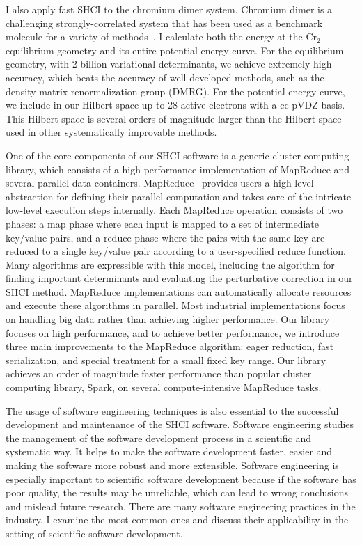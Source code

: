 \documentclass[phd,tocprelim]{cornell}
\begin{document}
I also apply fast SHCI to the chromium dimer system.
Chromium dimer is a challenging strongly-correlated system that has been used as a benchmark molecule for a variety of methods~\cite{Scu-JCP-91,KurYan-JCP-11,PurZhaKra-JCP-15,MaManOlsGag-JCTC-16,VanMalVer-JCTC-16,GuoWatHuSunCha-JCTC-16}.
I calculate both the energy at the Cr$_2$ equilibrium geometry and its entire potential energy curve.
For the equilibrium geometry, with 2 billion variational determinants, we achieve extremely high accuracy, which beats the accuracy of well-developed methods, such as the density matrix renormalization group (DMRG).
For the potential energy curve, we include in our Hilbert space up to 28 active electrons with a cc-pVDZ basis.
This Hilbert space is several orders of magnitude larger than the Hilbert space used in other systematically improvable methods.

One of the core components of our SHCI software is a generic cluster computing library, which consists of a high-performance implementation of MapReduce and several parallel data containers.
MapReduce~\cite{dean2008mapreduce,dean2010mapreduce} provides users a high-level abstraction for defining their parallel computation and takes care of the intricate low-level execution steps internally.
Each MapReduce operation consists of two phases: a map phase where each input is mapped to a set of intermediate key/value pairs, and a reduce phase where the pairs with the same key are reduced to a single key/value pair according to a user-specified reduce function.
Many algorithms are expressible with this model, including the algorithm for finding important determinants and evaluating the perturbative correction in our SHCI method.
MapReduce implementations can automatically allocate resources and execute these algorithms in parallel.
Most industrial implementations focus on handling big data rather than achieving higher performance.
Our library focuses on high performance, and to achieve better performance, we introduce three main improvements to the MapReduce algorithm: eager reduction, fast serialization, and special treatment for a small fixed key range.
Our library achieves an order of magnitude faster performance than popular cluster computing library, Spark, on several compute-intensive MapReduce tasks.

The usage of software engineering techniques is also essential to the successful development and maintenance of the SHCI software.
Software engineering studies the management of the software development process in a scientific and systematic way.
It helps to make the software development faster, easier and making the software more robust and more extensible.
Software engineering is especially important to scientific software development because if the software has poor quality, the results may be unreliable, which can lead to wrong conclusions and mislead future research.
There are many software engineering practices in the industry.
I examine the most common ones and discuss their applicability in the setting of scientific software development.
\end{document}
